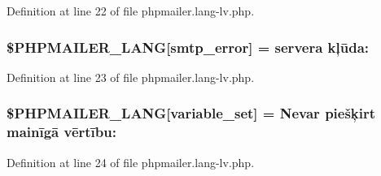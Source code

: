 Definition at line 22 of file phpmailer.\+lang-\/lv.\+php.

\subsubsection[{\texorpdfstring{\$\+P\+H\+P\+M\+A\+I\+L\+E\+R\+\_\+\+L\+A\+NG}{$PHPMAILER_LANG}}]{\setlength{\rightskip}{0pt plus 5cm}\$P\+H\+P\+M\+A\+I\+L\+E\+R\+\_\+\+L\+A\+NG\mbox{[}\textquotesingle{}smtp\+\_\+error\textquotesingle{}\mbox{]} =  servera kļūda\+: \textquotesingle{}}\hypertarget{phpmailer_8lang-lv_8php_a7d9cffba1e669c845f8a4c891ee50064}{}\label{phpmailer_8lang-lv_8php_a7d9cffba1e669c845f8a4c891ee50064}


Definition at line 23 of file phpmailer.\+lang-\/lv.\+php.

\subsubsection[{\texorpdfstring{\$\+P\+H\+P\+M\+A\+I\+L\+E\+R\+\_\+\+L\+A\+NG}{$PHPMAILER_LANG}}]{\setlength{\rightskip}{0pt plus 5cm}\$P\+H\+P\+M\+A\+I\+L\+E\+R\+\_\+\+L\+A\+NG\mbox{[}\textquotesingle{}variable\+\_\+set\textquotesingle{}\mbox{]} = \textquotesingle{}Nevar piešķirt mainīgā vērtību\+: \textquotesingle{}}\hypertarget{phpmailer_8lang-lv_8php_af795debc7a739d038742691c358d9032}{}\label{phpmailer_8lang-lv_8php_af795debc7a739d038742691c358d9032}


Definition at line 24 of file phpmailer.\+lang-\/lv.\+php.

